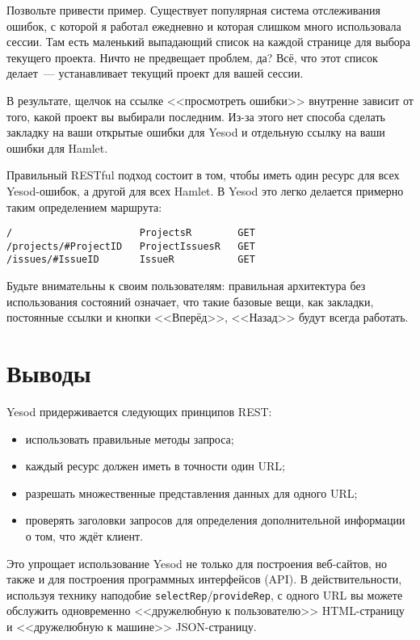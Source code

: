 Позвольте привести пример. Существует популярная система отслеживания ошибок, с
которой я работал ежедневно и которая слишком много использовала сессии. Там
есть маленький выпадающий список на каждой странице для выбора текущего
проекта. Ничто не предвещает проблем, да? Всё, что этот список делает~---
устанавливает текущий проект для вашей сессии.

В результате, щелчок на ссылке <<просмотреть ошибки>> внутренне зависит от
того, какой проект вы выбирали последним. Из-за этого нет способа сделать
закладку на ваши открытые ошибки для Yesod и отдельную ссылку на ваши ошибки
для Hamlet.

Правильный RESTful подход состоит в том, чтобы иметь один ресурс для всех
Yesod-ошибок, а другой для всех Hamlet. В Yesod это легко делается примерно
таким определением маршрута:
\begin{lstlisting}
/                      ProjectsR        GET
/projects/#ProjectID   ProjectIssuesR   GET
/issues/#IssueID       IssueR           GET
\end{lstlisting}

Будьте внимательны к своим пользователям: правильная архитектура без
использования состояний означает, что такие базовые вещи, как закладки,
постоянные ссылки и кнопки <<Вперёд>>, <<Назад>> будут всегда работать.

\section{Выводы}

Yesod придерживается следующих принципов REST:
\begin{itemize}
    \item использовать правильные методы запроса;
    \item каждый ресурс должен иметь в точности один URL;
    \item разрешать множественные представления данных для одного URL;
    \item проверять заголовки запросов для определения дополнительной
        информации о том, что ждёт клиент.
\end{itemize}

Это упрощает использование Yesod не только для построения веб-сайтов, но также
и для построения программных интерфейсов (API). В действительности, используя
технику наподобие \lstinline'selectRep'/\lstinline'provideRep', с одного URL вы
можете обслужить одновременно <<дружелюбную к пользователю>> HTML-страницу и
<<дружелюбную к машине>> JSON-страницу.
